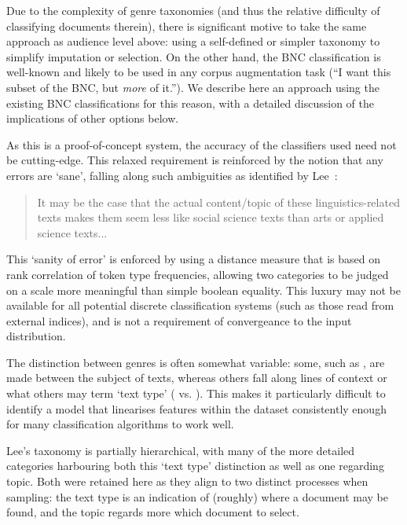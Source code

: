 Due to the complexity of genre taxonomies (and thus the relative difficulty of classifying documents therein), there is significant motive to take the same approach as audience level above: using a self-defined or simpler taxonomy to simplify imputation or selection.  On the other hand, the BNC classification is well-known and likely to be used in any corpus augmentation task (``I want this subset of the BNC, but \textsl{more} of it.'').  We describe here an approach using the existing BNC classifications for this reason, with a detailed discussion of the implications of other options below.


As this is a proof-of-concept system, the accuracy of the classifiers used need not be cutting-edge.  This relaxed requirement is reinforced by the notion that any errors are `sane', falling along such ambiguities as identified by Lee~\cite[p.~11]{lee2003bnc}:

\begin{quote}
It may be the case that the actual content/topic of these linguistics-related texts makes them seem less like social science texts than arts or applied science texts...
\end{quote}

This `sanity of error' is enforced by using a distance measure that is based on rank correlation of token type frequencies, allowing two categories to be judged on a scale more meaningful than simple boolean equality.  This luxury may not be available for all potential discrete classification systems (such as those read from external indices), and is not a requirement of convergeance to the input distribution.

The distinction between genres is often somewhat variable: some, such as , are made between the subject of texts, whereas others fall along lines of context or what others may term `text type' ( vs. ).  This makes it particularly difficult to identify a model that linearises features within the dataset consistently enough for many classification algorithms to work well.

Lee's taxonomy is partially hierarchical, with many of the more detailed categories harbouring both this `text type' distinction as well as one regarding topic.  Both were retained here as they align to two distinct processes when sampling: the text type is an indication of (roughly) where a document may be found, and the topic regards more which document to select.





